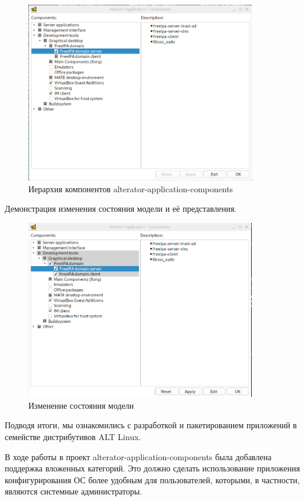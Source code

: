 \documentclass[bachelor, och, pract]{SCWorks}
\begin{document}
\begin{figure}[!ht]
	\centering
	\includegraphics[width=10cm]{ierarchy.png}
	\caption{\label{fig:f2}%
	Иерархия компонентов alterator-application-components}
\end{figure}

Демонстрация изменения состояния модели и её представления.

\begin{figure}[!ht]
	\centering
	\includegraphics[width=10cm]{ierarchy-changed.png}
	\caption{\label{fig:f2}%
	Изменение состояния модели}
\end{figure}

\newpage

\conclusion

Подводя итоги, мы ознакомились с разработкой и пакетированием приложений в семействе дистрибутивов ALT Linux.

В ходе работы в проект alterator-application-components была добавлена поддержка вложенных категорий.
Это должно сделать использование приложения конфигурирования ОС более удобным для пользователей, которыми, в частности, являются системные администраторы.
\end{document}
